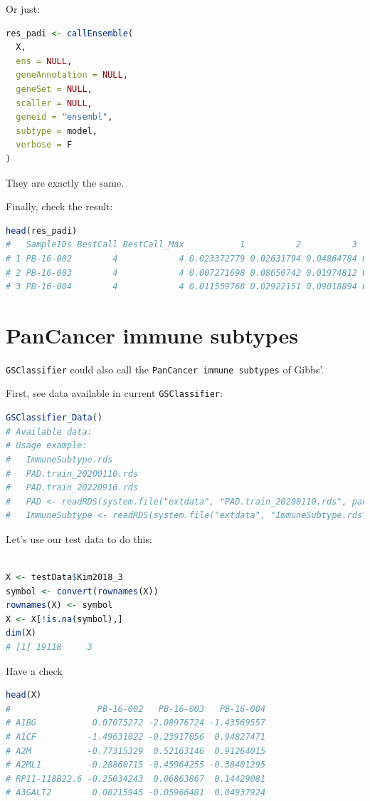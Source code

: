 \documentclass[
  12pt,
]{book}
\newcommand{\passthrough}[1]{#1}
\begin{document}
Or just:

\begin{lstlisting}[language=R]
res_padi <- callEnsemble(
  X,
  ens = NULL,
  geneAnnotation = NULL,
  geneSet = NULL,
  scaller = NULL,
  geneid = "ensembl",
  subtype = model, 
  verbose = F
)
\end{lstlisting}

They are exactly the same.

Finally, check the result:

\begin{lstlisting}[language=R]
head(res_padi)
#   SampleIDs BestCall BestCall_Max           1          2          3         4
# 1 PB-16-002        4            4 0.023372779 0.02631794 0.04864784 0.3336484
# 2 PB-16-003        4            4 0.007271698 0.08650742 0.01974812 0.9530730
# 3 PB-16-004        4            4 0.011559768 0.02922151 0.09018894 0.8649045
\end{lstlisting}

\hypertarget{pancancer-immune-subtypes}{%
\section{PanCancer immune subtypes}\label{pancancer-immune-subtypes}}

\passthrough{\lstinline!GSClassifier!} could also call the \passthrough{\lstinline!PanCancer immune subtypes!} of Gibbs'.

First, see data available in current \passthrough{\lstinline!GSClassifier!}:

\begin{lstlisting}[language=R]
GSClassifier_Data()
# Available data:
# Usage example:
#   ImmuneSubtype.rds 
#   PAD.train_20200110.rds 
#   PAD.train_20220916.rds 
#   PAD <- readRDS(system.file("extdata", "PAD.train_20200110.rds", package = "GSClassifier")) 
#   ImmuneSubtype <- readRDS(system.file("extdata", "ImmuneSubtype.rds", package = "GSClassifier"))
\end{lstlisting}

Let's use our test data to do this:

\begin{lstlisting}[language=R]

X <- testData$Kim2018_3
symbol <- convert(rownames(X))
rownames(X) <- symbol
X <- X[!is.na(symbol),]
dim(X)
# [1] 19118     3
\end{lstlisting}

Have a check

\begin{lstlisting}[language=R]
head(X)
#                 PB-16-002   PB-16-003   PB-16-004
# A1BG           0.07075272 -2.08976724 -1.43569557
# A1CF          -1.49631022 -0.23917056  0.94827471
# A2M           -0.77315329  0.52163146  0.91264015
# A2ML1         -0.28860715 -0.45964255 -0.38401295
# RP11-118B22.6 -0.25034243  0.06863867  0.14429081
# A3GALT2        0.08215945 -0.05966481  0.04937924
\end{lstlisting}
\end{document}
